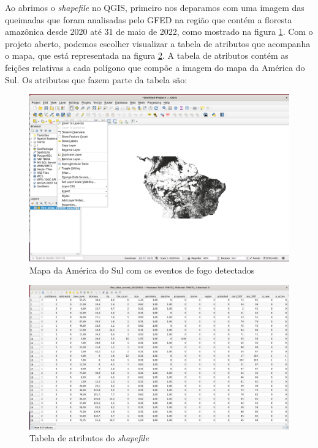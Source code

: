 Ao abrimos o \textit{shapefile} no QGIS, primeiro nos deparamos com uma imagem das queimadas que foram analisadas pelo GFED na região que contém a floresta amazônica desde 2020 até 31 de maio de 2022, como mostrado na figura \ref{fig:mapashp}. Com o projeto aberto, podemos escolher visualizar a tabela de atributos que acompanha o mapa, que está representada na figura \ref{fig:tabat}. A tabela de atributos contém as feições relativas a cada polígono que compõe a imagem do mapa da América do Sul. Os atributos que fazem parte da tabela são:

\begin{figure}[htb]
	\centering
	\begin{minipage}{0.9\linewidth}
		\centering
		\includegraphics[width=\linewidth]{tg1/figuras/mapa.png}
		\caption{Mapa da América do Sul com os eventos de fogo detectados} \label{fig:mapashp}
	\end{minipage}
\end{figure}

\begin{figure}[htb]
	\centering
	\begin{minipage}{0.9\linewidth}
		\centering
		\includegraphics[width=\linewidth]{tg1/figuras/tabela_atributos.png}
		\caption{Tabela de atributos do \textit{shapefile}} \label{fig:tabat}
	\end{minipage}
\end{figure}


